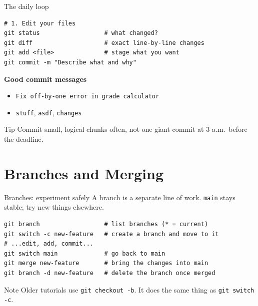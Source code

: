 \documentclass[aspectratio=169,11pt]{beamer}
\newcommand{\cmd}[1]{\texttt{\color{gitred}#1}}
\begin{document}
\begin{frame}[fragile]{The daily loop}
\begin{lstlisting}
# 1. Edit your files
git status                  # what changed?
git diff                    # exact line-by-line changes
git add <file>              # stage what you want
git commit -m "Describe what and why"
\end{lstlisting}

  \vspace{0.3em}
  \textbf{Good commit messages}
  \begin{itemize}
    \item[\textcolor{green!50!black}{\checkmark}] \texttt{Fix off-by-one error in grade calculator}
    \item[\textcolor{red}{$\times$}] \texttt{stuff}, \texttt{asdf}, \texttt{changes}
  \end{itemize}

  \begin{block}{Tip}
    Commit small, logical chunks often, not one giant commit at 3 a.m.\ before the deadline.
  \end{block}
\end{frame}

\section{Branches and Merging}

\begin{frame}[fragile]{Branches: experiment safely}
  A branch is a separate line of work. \texttt{main} stays stable; try new things elsewhere.

\begin{lstlisting}
git branch                  # list branches (* = current)
git switch -c new-feature   # create a branch and move to it
# ...edit, add, commit...
git switch main             # go back to main
git merge new-feature       # bring the changes into main
git branch -d new-feature   # delete the branch once merged
\end{lstlisting}

  \begin{block}{Note}
    Older tutorials use \cmd{git checkout -b}. It does the same thing as \cmd{git switch -c}.
  \end{block}
\end{frame}
\end{document}

